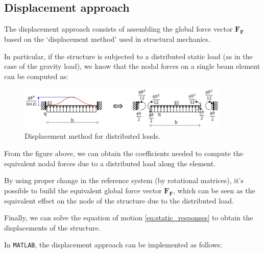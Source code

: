 \subsection{Displacement approach}
\label{subsec:displacement_approach}

The displacement approach consists of assembling the global force vector $\mathbf{F_F}$ based on the `displacement method' used in structural mechanics.

In particular, if the structure is subjected to a distributed static load (as in the case of the gravity load), we know that the nodal forces on a single beam element can be computed as:

\begin{figure}[H]
    \centering
    \includegraphics[width=0.9\textwidth]{img/displacement-method.png}
    \caption{Displacement method for distributed loads.}
    \label{fig:displacement_method}
\end{figure}

From the figure above, we can obtain the coefficients needed to compute the equivalent nodal forces due to a distributed load along the element.

By using proper change in the reference system (by rotational matrices), it's possible to build the equivalent global force vector $\mathbf{F_F}$, which can be seen as the equivalent effect on the node of the structure due to the distributed load.

Finally, we can solve the equation of motion \ref{eq:static_responses} to obtain the displacements of the structure.

In \texttt{MATLAB}, the displacement approach can be implemented as follows:

